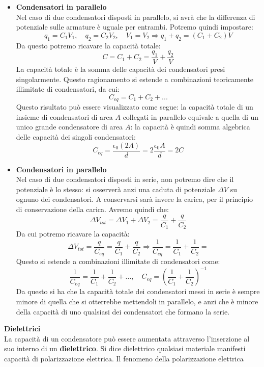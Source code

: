 \documentclass[a4paper,12pt]{article}
\begin{document}
\begin{itemize}
  \item \textbf{Condensatori in parallelo} \\
    Nel caso di due condensatori disposti in parallelo, si avrà che la differenza di potenziale sulle armature è uguale per entrambi. Potremo quindi impostare:
    $$ q_1 = C_1 V_1, \quad q_2 = C_2 V_2, \quad V_1 = V_2 \Rightarrow q_1+q_2 = (C_1+C_2)V $$
    Da questo potremo ricavare la capacità totale:
    $$ C = C_1 + C_2 = \frac{q_1}{V} + \frac{q_2}{V} $$
    La capacità totale è la somma delle capacità dei condensatori presi singolarmente.
    Questo ragionamento si estende a combinazioni teoricamente illimitate di condensatori, da cui:
    $$ C_{eq} = C_1+C_2+...$$
    Questo risultato può essere visualizzato come segue: la capacità totale di un insieme di condensatori di area $A$ collegati in parallelo equivale a quella di un unico grande condensatore di area $A$:
    la capacità è quindi somma algebrica delle capacità dei singoli condensatori:
    $$ C_{eq} = \frac{\epsilon_0 (2A)}{d} = 2 \frac{\epsilon_0A}{d} = 2C $$
  \item \textbf{Condensatori in parallelo} \\
    Nel caso di due condensatori disposti in serie, non potremo dire che il potenziale è lo stesso: si osserverà anzi una caduta di potenziale $\Delta V$ su ognuno dei condensatori. A conservarsi sarà invece la carica,
    per il principio di conservazione della carica. Avremo quindi che:
    $$ \Delta V_{tot} = \Delta V_1 + \Delta V_2 = \frac{q}{C_1} + \frac{q}{C_2} $$
    Da cui potremo ricavare la capacità:
    $$ \Delta V_{tot} = \frac{q}{C_{eq}} = \frac{q}{C_1} + \frac{q}{C_2} \Rightarrow \frac{1}{C_{eq}} = \frac{1}{C_1} + \frac{1}{C_2} = $$
    Questo si estende a combinazioni illimitate di condensatori come:
    $$ \frac{1}{C_{eq}} = \frac{1}{C_1} + \frac{1}{C_2} + ..., \quad C_{eq} = \left( \frac{1}{C_1} + \frac{1}{C_2} \right)^{-1} $$
    Da questo si ha che la capacità totale dei condensatori messi in serie è sempre minore di quella che si otterrebbe mettendoli in parallelo, e anzi che è minore della capacità di uno qualsiasi dei condensatori che formano
    la serie.
\end{itemize}
\par\smallskip
\textbf{Dielettrici} \\
La capacità di un condensatore può essere aumentata attraverso l'inserzione al suo interno di un \textbf{dielettrico}. Si dice dielettrico qualsiasi materiale manifesti capacità di polarizzazione elettrica. Il fenomeno della polarizzazione elettrica
\end{document}
